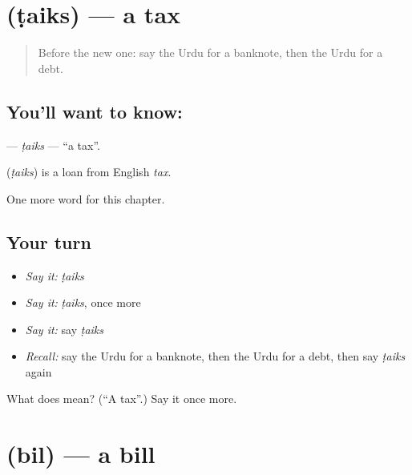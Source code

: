 \section[\texorpdfstring{\ur{ٹیکس} (ṭaiks)}{ٹیکس (ṭaiks)}]{ (ṭaiks) — a tax}

\label{lesson:UR-C209-taiks}



\begin{quote}
Before the new one: say the Urdu for a banknote, then the Urdu for a debt.
\end{quote}

\subsection*{You'll want to know: }
\textbf{} — \emph{ṭaiks} — \textquotedblleft{}a tax\textquotedblright{}.

\begin{cousinweb}
\textbf{} (\emph{ṭaiks}) is a loan from English \emph{tax}.
\end{cousinweb}

\begin{grammarlens}[title={What you've built}]
One more word for this chapter.
\end{grammarlens}

\subsection*{Your turn}
\begin{itemize}
\raggedright
  \item \emph{Say it:} \emph{ṭaiks}
  \item \emph{Say it:} \emph{ṭaiks}, once more
  \item \emph{Say it:} say \emph{ṭaiks}
  \item \emph{Recall:} say the Urdu for a banknote, then the Urdu for a debt, then say \emph{ṭaiks} again
\end{itemize}

\begin{tcolorbox}[breakable,colback=teal!4,colframe=teal!35!black,title={Before you move on}]
What does  mean? (\textquotedblleft{}A tax\textquotedblright{}.) Say it once more.
\end{tcolorbox}
\section[\texorpdfstring{\ur{بل} (bil)}{بل (bil)}]{ (bil) — a bill}

